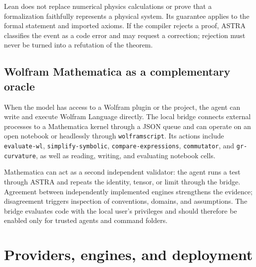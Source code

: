 \documentclass[11pt,a4paper]{article}
\begin{document}
Lean does not replace numerical physics calculations or prove that a formalization faithfully represents a physical system. Its guarantee applies to the formal statement and imported axioms. If the compiler rejects a proof, ASTRA classifies the event as a code error and may request a correction; rejection must never be turned into a refutation of the theorem.

\subsection{Wolfram Mathematica as a complementary oracle}

When the model has access to a Wolfram plugin or the  project, the agent can write and execute Wolfram Language directly. The local bridge connects external processes to a Mathematica kernel through a JSON queue and can operate on an open notebook or headlessly through \texttt{wolframscript}. Its actions include \texttt{evaluate-wl}, \texttt{simplify-symbolic}, \texttt{compare-expressions}, \texttt{commutator}, and \texttt{gr-curvature}, as well as reading, writing, and evaluating notebook cells.

Mathematica can act as a second independent validator: the agent runs a test through ASTRA and repeats the identity, tensor, or limit through the bridge. Agreement between independently implemented engines strengthens the evidence; disagreement triggers inspection of conventions, domains, and assumptions. The bridge evaluates code with the local user's privileges and should therefore be enabled only for trusted agents and command folders.

\section{Providers, engines, and deployment}
\end{document}
